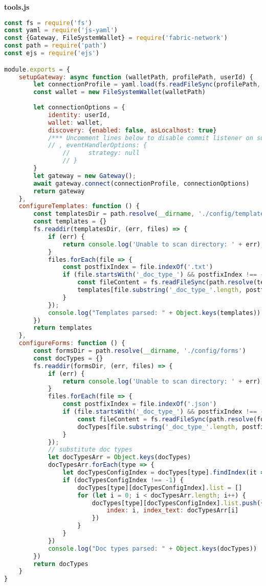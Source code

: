 \textbf{tools.js}
\begin{lstlisting}[language=JavaScript]
const fs = require('fs')
const yaml = require('js-yaml')
const {Gateway, FileSystemWallet} = require('fabric-network')
const path = require('path')
const ejs = require('ejs')

module.exports = {
	setupGateway: async function (walletPath, profilePath, userId) {
		let connectionProfile = yaml.load(fs.readFileSync(profilePath, 'utf8'));
		const wallet = new FileSystemWallet(walletPath)
		
		let connectionOptions = {
			identity: userId,
			wallet: wallet,
			discovery: {enabled: false, asLocalhost: true}
			/*** Uncomment lines below to disable commit listener on submit ****/
			// , eventHandlerOptions: {
				//     strategy: null
				// }
		}
		let gateway = new Gateway();
		await gateway.connect(connectionProfile, connectionOptions)
		return gateway
	},
	configureTemplates: function () {
		const templatesDir = path.resolve(__dirname, './config/templates')
		const templates = {}
		fs.readdir(templatesDir, (err, files) => {
			if (err) {
				return console.log('Unable to scan directory: ' + err);
			}
			files.forEach(file => {
				const postfixIndex = file.indexOf('.txt')
				if (file.startsWith('_doc_type_') && postfixIndex !== -1) {
					const fileContent = fs.readFileSync(path.resolve(templatesDir, file), 'utf-8').toString()
					templates[file.substring('_doc_type_'.length, postfixIndex)] = ejs.compile(fileContent, {rmWhitespace: true})
				}
			});
			console.log("Templates parsed: " + Object.keys(templates))
		})
		return templates
	},
	configureForms: function () {
		const formsDir = path.resolve(__dirname, './config/forms')
		const docTypes = {}
		fs.readdir(formsDir, (err, files) => {
			if (err) {
				return console.log('Unable to scan directory: ' + err);
			}
			files.forEach(file => {
				const postfixIndex = file.indexOf('.json')
				if (file.startsWith('_doc_type_') && postfixIndex !== -1) {
					const fileContent = fs.readFileSync(path.resolve(formsDir, file), 'utf-8').toString()
					docTypes[file.substring('_doc_type_'.length, postfixIndex)] = JSON.parse(fileContent)
				}
			});
			// substitute doc types
			let docTypesArr = Object.keys(docTypes)
			docTypesArr.forEach(type => {
				let docTypesConfigIndex = docTypes[type].findIndex(it => it._id === 'type')
				if (docTypesConfigIndex !== -1) {
					docTypes[type][docTypesConfigIndex].list = []
					for (let i = 0; i < docTypesArr.length; i++) {
						docTypes[type][docTypesConfigIndex].list.push({
							index: i, index_text: docTypesArr[i]
						})
					}
				}
			})
			console.log("Doc types parsed: " + Object.keys(docTypes))
		})
		return docTypes
	}
}
\end{lstlisting}


